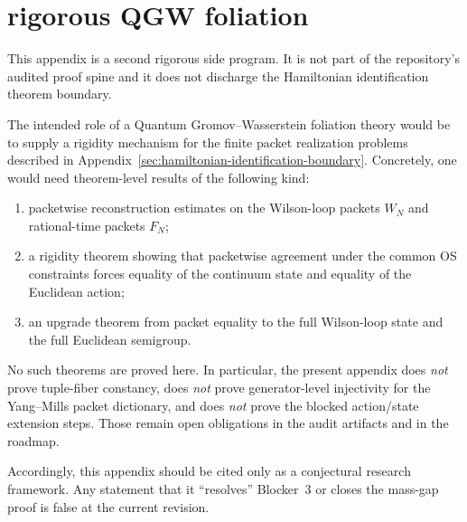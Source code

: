 \section{rigorous QGW foliation}
\label{app:qgw_foliation}

This appendix is a second rigorous side program. It is not part of the
repository's audited proof spine and it does not discharge the Hamiltonian
identification theorem boundary.

The intended role of a Quantum Gromov--Wasserstein foliation theory would be to
supply a rigidity mechanism for the finite packet realization problems described
in Appendix~\ref{sec:hamiltonian-identification-boundary}. Concretely, one would
need theorem-level results of the following kind:
\begin{enumerate}
\item packetwise reconstruction estimates on the Wilson-loop packets $W_N$ and
rational-time packets $F_N$;
\item a rigidity theorem showing that packetwise agreement under the common OS
constraints forces equality of the continuum state and equality of the
Euclidean action;
\item an upgrade theorem from packet equality to the full Wilson-loop state and
the full Euclidean semigroup.
\end{enumerate}

No such theorems are proved here. In particular, the present appendix does
\emph{not} prove tuple-fiber constancy, does \emph{not} prove generator-level
injectivity for the Yang--Mills packet dictionary, and does \emph{not} prove the
blocked action/state extension steps. Those remain open obligations in the audit
artifacts and in the roadmap.

Accordingly, this appendix should be cited only as a conjectural research
framework. Any statement that it ``resolves'' Blocker~3 or closes the mass-gap
proof is false at the current revision.
\endinput
